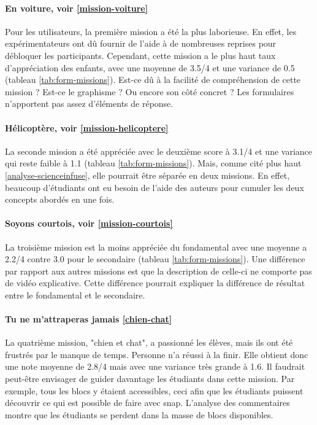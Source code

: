 \paragraph{En voiture, voir \ref{mission-voiture}}
Pour les utilisateurs, la première \gls{mission} a été la plus laborieuse. En effet, les expérimentateurs ont dû fournir de l'aide à de nombreuses reprises pour débloquer les participants. Cependant, cette \gls{mission} a le plus haut taux d'appréciation des enfants, avec une moyenne de 3.5/4 et une variance de 0.5 (tableau \ref{tab:form-missions}). Est-ce dû à la facilité de compréhension de cette \gls{mission} ? Est-ce le graphisme ? Ou encore son côté concret ? Les formulaires n'apportent pas assez d'éléments de réponse.

\paragraph{Hélicoptère, voir \ref{mission-helicoptere}}
La seconde \gls{mission} a été appréciée avec le deuxième score à 3.1/4 et une variance qui reste faible à 1.1 (tableau \ref{tab:form-missions}). Mais, comme cité plus haut \ref{analyse-scienceinfuse}, elle pourrait être séparée en deux \glspl{mission}. En effet, beaucoup d'étudiants ont eu besoin de l'aide des auteurs pour cumuler les deux concepts abordés en une fois.

\paragraph{Soyons courtois, voir \ref{mission-courtois}}
La troisième \gls{mission} est la moins appréciée du \gls{fondamental} avec une moyenne a 2.2/4 contre 3.0 pour le \gls{secondaire} (tableau \ref{tab:form-missions}). Une différence par rapport aux autres \glspl{mission} est que la description de celle-ci ne comporte pas de vidéo explicative. Cette différence pourrait expliquer la différence de résultat entre le \gls{fondamental} et le \gls{secondaire}.

\paragraph{Tu ne m'attraperas jamais \ref{chien-chat}}
La quatrième \gls{mission}, "chien et chat", a passionné les élèves, mais ils ont été frustrés par le manque de temps. Personne n'a réussi à la finir. Elle obtient donc une note moyenne de 2.8/4 mais avec une variance très grande à 1.6. Il faudrait peut-être envisager de guider davantage les étudiants dans cette \gls{mission}. Par exemple, tous les \glspl{bloc} y étaient accessibles, ceci afin que les étudiants puissent découvrir ce qui est possible de faire avec \gls{snap}. L'analyse des commentaires montre que les étudiants se perdent dans la masse de \glspl{bloc} disponibles.

